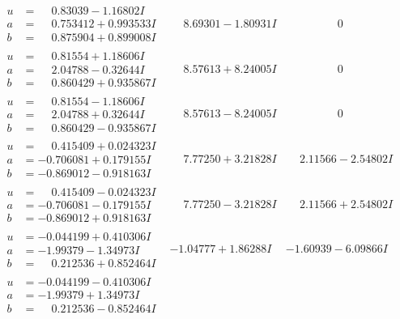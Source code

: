 \documentclass[1p]{elsarticle_modified}
\theoremstyle{definition}
\begin{document}
$$\begin{array}{c|c|c}
\begin{aligned}
u &= \phantom{-}0.83039 - 1.16802 I \\
a &= \phantom{-}0.753412 + 0.993533 I \\
b &= \phantom{-}0.875904 + 0.899008 I\end{aligned}
 & \phantom{-}8.69301 - 1.80931 I & \phantom{-0.000000 } 0 \\ \hline\begin{aligned}
u &= \phantom{-}0.81554 + 1.18606 I \\
a &= \phantom{-}2.04788 - 0.32644 I \\
b &= \phantom{-}0.860429 + 0.935867 I\end{aligned}
 & \phantom{-}8.57613 + 8.24005 I & \phantom{-0.000000 } 0 \\ \hline\begin{aligned}
u &= \phantom{-}0.81554 - 1.18606 I \\
a &= \phantom{-}2.04788 + 0.32644 I \\
b &= \phantom{-}0.860429 - 0.935867 I\end{aligned}
 & \phantom{-}8.57613 - 8.24005 I & \phantom{-0.000000 } 0 \\ \hline\begin{aligned}
u &= \phantom{-}0.415409 + 0.024323 I \\
a &= -0.706081 + 0.179155 I \\
b &= -0.869012 - 0.918163 I\end{aligned}
 & \phantom{-}7.77250 + 3.21828 I & \phantom{-}2.11566 - 2.54802 I \\ \hline\begin{aligned}
u &= \phantom{-}0.415409 - 0.024323 I \\
a &= -0.706081 - 0.179155 I \\
b &= -0.869012 + 0.918163 I\end{aligned}
 & \phantom{-}7.77250 - 3.21828 I & \phantom{-}2.11566 + 2.54802 I \\ \hline\begin{aligned}
u &= -0.044199 + 0.410306 I \\
a &= -1.99379 - 1.34973 I \\
b &= \phantom{-}0.212536 + 0.852464 I\end{aligned}
 & -1.04777 + 1.86288 I & -1.60939 - 6.09866 I \\ \hline\begin{aligned}
u &= -0.044199 - 0.410306 I \\
a &= -1.99379 + 1.34973 I \\
b &= \phantom{-}0.212536 - 0.852464 I\end{aligned}

\end{array}$$
\end{document}
